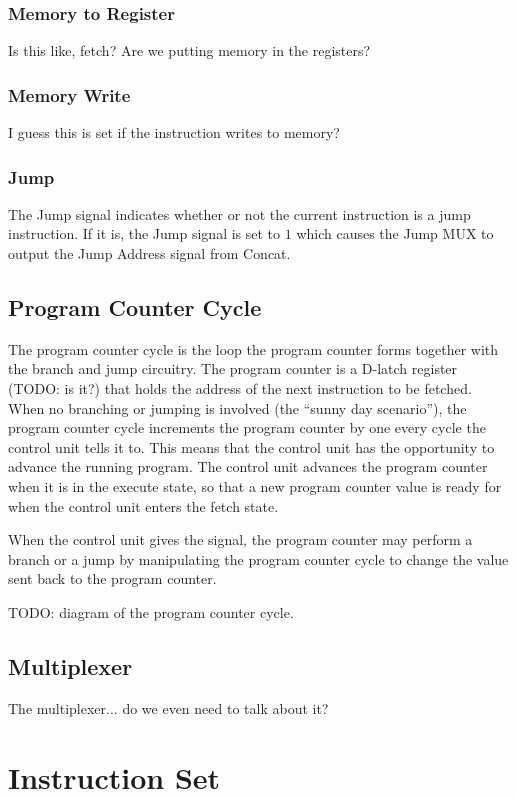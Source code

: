 \subsubsection{Memory to Register}
Is this like, fetch? Are we putting memory in the registers?

\subsubsection{Memory Write}
I guess this is set if the instruction writes to memory?

\subsubsection{Jump}
The Jump signal indicates whether or not the current instruction is a jump instruction. If it is, the Jump signal is set to $1$ which causes the Jump MUX to output the Jump Address signal from Concat.

\subsection{Program Counter Cycle}

The program counter cycle is the loop the program counter forms together with the branch and jump circuitry.
The program counter is a D-latch register (TODO: is it?) that holds the address of the next instruction to be fetched.
When no branching or jumping is involved (the ``sunny day scenario''), the program counter cycle increments the program counter by one every cycle the control unit tells it to.
This means that the control unit has the opportunity to advance the running program.
The control unit advances the program counter when it is in the execute state, so that a new program counter value is ready for when the control unit enters the fetch state.

When the control unit gives the signal, the program counter may perform a branch or a jump by manipulating the program counter cycle to change the value sent back to the program counter.

TODO: diagram of the program counter cycle.

\subsection{Multiplexer}

The multiplexer... do we even need to talk about it?

\section{Instruction Set}

